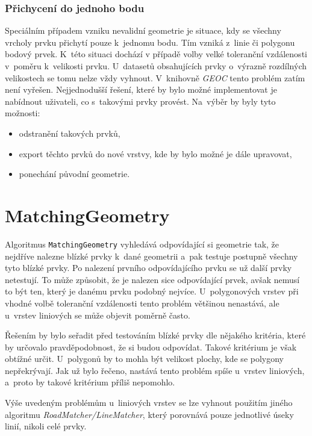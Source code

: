 \subsubsection{Přichycení do jednoho bodu}
Speciálním případem vzniku nevalidní geometrie je situace, kdy se všechny 
vrcholy prvku přichytí pouze k~jednomu bodu. Tím vzniká z~linie či polygonu
bodový prvek. K~této situaci dochází v případě volby velké toleranční 
vzdálenosti v~poměru k~velikosti prvku. U~datasetů obsahujících prvky
o~výrazně rozdílných velikostech se tomu nelze vždy vyhnout. V~knihovně
\textit{GEOC} tento problém zatím není vyřešen. Nejjednodušší řešení, které
by bylo možné implementovat je nabídnout uživateli, co s~takovými prvky provést.
Na~výběr by byly tyto možnosti:
\begin{itemize}
 \item odstranění takových prvků,
 \item export těchto prvků do nové vrstvy, kde by bylo možné je dále upravovat,
 \item ponechání původní geometrie. 
\end{itemize}


\section{MatchingGeometry}
\label{problemy-mg}

Algoritmus \texttt{MatchingGeometry} vyhledává odpovídající si geometrie tak,
že nejdříve nalezne blízké prvky k~dané geometrii a~pak testuje postupně všechny
tyto blízké prvky. Po nalezení prvního odpovídajícího prvku se už další prvky
netestují. To může způsobit, že je nalezen sice odpovídající prvek, avšak
nemusí to být ten, který je danému prvku podobný nejvíce. U~polygonových vrstev
při vhodné volbě toleranční vzdálenosti tento problém většinou nenastává, 
ale u~vrstev liniových se může objevit poměrně často. 

Řešením by bylo seřadit před testováním blízké prvky dle nějakého
kritéria, které by určovalo pravděpodobnost, že si budou odpovídat. Takové
kritérium je však obtížné určit. U~polygonů by to mohla být velikost plochy,
kde se polygony nepřekrývají. Jak už bylo řečeno, nastává tento problém
spíše u~vrstev liniových, a~proto by takové kritérium příliš nepomohlo.


Výše uvedeným problémům u~liniových vrstev se lze vyhnout použitím jiného
algoritmu \textit{RoadMatcher/LineMatcher}, který porovnává pouze jednotlivé
úseky linií, nikoli celé prvky. 

